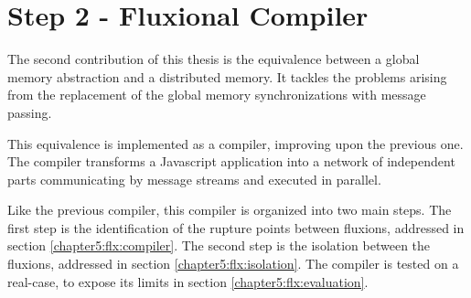 \section{Step 2 - Fluxional Compiler} \label{chapter5:flx}


The second contribution of this thesis is the equivalence between a global memory abstraction and a distributed memory.
It tackles the problems arising from the replacement of the global memory synchronizations with message passing.

This equivalence is implemented as a compiler, improving upon the previous one.
The compiler transforms a Javascript application into a network of independent parts communicating by message streams and executed in parallel.

Like the previous compiler, this compiler is organized into two main steps.
The first step is the identification of the rupture points between fluxions, addressed in section \ref{chapter5:flx:compiler}.
The second step is the isolation between the fluxions, addressed in section \ref{chapter5:flx:isolation}.
The compiler is tested on a real-case, to expose its limits in section \ref{chapter5:flx:evaluation}.





